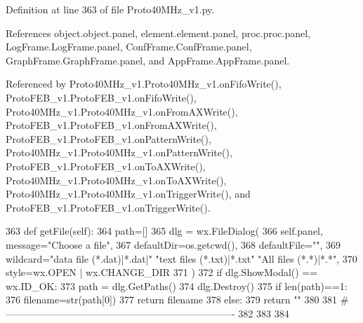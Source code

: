 Definition at line 363 of file Proto40\+M\+Hz\+\_\+v1.\+py.



References object.\+object.\+panel, element.\+element.\+panel, proc.\+proc.\+panel, Log\+Frame.\+Log\+Frame.\+panel, Conf\+Frame.\+Conf\+Frame.\+panel, Graph\+Frame.\+Graph\+Frame.\+panel, and App\+Frame.\+App\+Frame.\+panel.



Referenced by Proto40\+M\+Hz\+\_\+v1.\+Proto40\+M\+Hz\+\_\+v1.\+on\+Fifo\+Write(), Proto\+F\+E\+B\+\_\+v1.\+Proto\+F\+E\+B\+\_\+v1.\+on\+Fifo\+Write(), Proto40\+M\+Hz\+\_\+v1.\+Proto40\+M\+Hz\+\_\+v1.\+on\+From\+A\+X\+Write(), Proto\+F\+E\+B\+\_\+v1.\+Proto\+F\+E\+B\+\_\+v1.\+on\+From\+A\+X\+Write(), Proto\+F\+E\+B\+\_\+v1.\+Proto\+F\+E\+B\+\_\+v1.\+on\+Pattern\+Write(), Proto40\+M\+Hz\+\_\+v1.\+Proto40\+M\+Hz\+\_\+v1.\+on\+Pattern\+Write(), Proto\+F\+E\+B\+\_\+v1.\+Proto\+F\+E\+B\+\_\+v1.\+on\+To\+A\+X\+Write(), Proto40\+M\+Hz\+\_\+v1.\+Proto40\+M\+Hz\+\_\+v1.\+on\+To\+A\+X\+Write(), Proto40\+M\+Hz\+\_\+v1.\+Proto40\+M\+Hz\+\_\+v1.\+on\+Trigger\+Write(), and Proto\+F\+E\+B\+\_\+v1.\+Proto\+F\+E\+B\+\_\+v1.\+on\+Trigger\+Write().


\begin{DoxyCode}
363     \textcolor{keyword}{def }getFile(self):
364         path=[]
365         dlg = wx.FileDialog(
366             self.panel, message=\textcolor{stringliteral}{"Choose a file"},
367             defaultDir=os.getcwd(), 
368             defaultFile=\textcolor{stringliteral}{""},
369             wildcard=\textcolor{stringliteral}{"data file (*.dat)|*.dat|"} \textcolor{stringliteral}{"text files (*.txt)|*.txt"} \textcolor{stringliteral}{"All files (*.*)|*.*"},
370             style=wx.OPEN | wx.CHANGE\_DIR
371             )
372         \textcolor{keywordflow}{if} dlg.ShowModal() == wx.ID\_OK:
373             path = dlg.GetPaths()
374         dlg.Destroy()
375         \textcolor{keywordflow}{if} len(path)==1:
376             filename=str(path[0])
377             \textcolor{keywordflow}{return} filename
378         \textcolor{keywordflow}{else}:   
379             \textcolor{keywordflow}{return} \textcolor{stringliteral}{""}
380          
381 \textcolor{comment}{#----------------------------------------------------------------------}
382 
383 
384 
\end{DoxyCode}
\mbox{\label{classProto40MHz__v1_1_1Proto40MHz__v1_a594dddbd5d1eb852aaa71fe9b9a23117}} 
